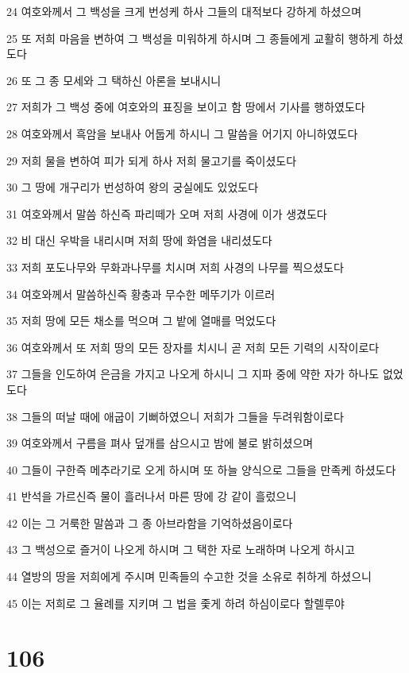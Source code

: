 \par 24 여호와께서 그 백성을 크게 번성케 하사 그들의 대적보다 강하게 하셨으며
\par 25 또 저희 마음을 변하여 그 백성을 미워하게 하시며 그 종들에게 교활히 행하게 하셨도다
\par 26 또 그 종 모세와 그 택하신 아론을 보내시니
\par 27 저희가 그 백성 중에 여호와의 표징을 보이고 함 땅에서 기사를 행하였도다
\par 28 여호와께서 흑암을 보내사 어둡게 하시니 그 말씀을 어기지 아니하였도다
\par 29 저희 물을 변하여 피가 되게 하사 저희 물고기를 죽이셨도다
\par 30 그 땅에 개구리가 번성하여 왕의 궁실에도 있었도다
\par 31 여호와께서 말씀 하신즉 파리떼가 오며 저희 사경에 이가 생겼도다
\par 32 비 대신 우박을 내리시며 저희 땅에 화염을 내리셨도다
\par 33 저희 포도나무와 무화과나무를 치시며 저희 사경의 나무를 찍으셨도다
\par 34 여호와께서 말씀하신즉 황충과 무수한 메뚜기가 이르러
\par 35 저희 땅에 모든 채소를 먹으며 그 밭에 열매를 먹었도다
\par 36 여호와께서 또 저희 땅의 모든 장자를 치시니 곧 저희 모든 기력의 시작이로다
\par 37 그들을 인도하여 은금을 가지고 나오게 하시니 그 지파 중에 약한 자가 하나도 없었도다
\par 38 그들의 떠날 때에 애굽이 기뻐하였으니 저희가 그들을 두려워함이로다
\par 39 여호와께서 구름을 펴사 덮개를 삼으시고 밤에 불로 밝히셨으며
\par 40 그들이 구한즉 메추라기로 오게 하시며 또 하늘 양식으로 그들을 만족케 하셨도다
\par 41 반석을 가르신즉 물이 흘러나서 마른 땅에 강 같이 흘렀으니
\par 42 이는 그 거룩한 말씀과 그 종 아브라함을 기억하셨음이로다
\par 43 그 백성으로 즐거이 나오게 하시며 그 택한 자로 노래하며 나오게 하시고
\par 44 열방의 땅을 저희에게 주시며 민족들의 수고한 것을 소유로 취하게 하셨으니
\par 45 이는 저희로 그 율례를 지키며 그 법을 좇게 하려 하심이로다 할렐루야

\chapter{106}

